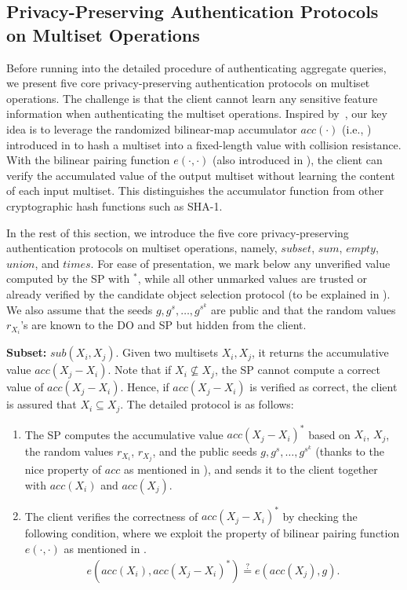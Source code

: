 \subsection{Privacy-Preserving Authentication Protocols on Multiset Operations}\label{sec:aggregate-queries:multiset-op}

Before running into the detailed procedure of authenticating aggregate queries, we present five core privacy-preserving authentication protocols on multiset operations. The challenge is that the client cannot learn any sensitive feature information when authenticating the multiset operations. Inspired by~\cite{10.1145/2660267.2660373}, our key idea is to leverage the randomized bilinear-map accumulator $acc(\cdot)$ (i.e., ) introduced in  to hash a multiset into a fixed-length value with collision resistance. With the bilinear pairing function $e(\cdot,\cdot)$ (also introduced in ), the client can verify the accumulated value of the output multiset without learning the content of each input multiset. This distinguishes the accumulator function from other cryptographic hash functions such as SHA-1.

In the rest of this section, we introduce the five core privacy-preserving authentication protocols on multiset operations, namely, $subset$, $sum$, $empty$, $union$, and $times$. For ease of presentation, we mark below any unverified value computed by the SP with $^*$, while all other unmarked values are trusted or already verified by the candidate object selection protocol (to be explained in ). We also assume that the seeds $g, g^s, \dots, g^{s^k}$ are public and that the random values $r_{X_i}$'s are known to the DO and SP but hidden from the client.

\textbf{Subset:} $sub(X_i, X_j)$.
Given two multisets $X_i, X_j$, it returns the accumulative value $acc(X_j-X_i)$. Note that if $X_i \nsubseteq X_j$, the SP cannot compute a correct value of $acc(X_j - X_i)$. Hence, if $acc(X_j-X_i)$ is verified as correct, the client is assured that $X_i \subseteq X_j$. The detailed protocol is as follows:
\begin{enumerate}
  \item The SP computes the accumulative value ${acc(X_j-X_i)}^*$ based on $X_i$, $X_j$, the random values $r_{X_i}$, $r_{X_j}$, and the public seeds $g, g^s, \dots, g^{s^k}$ (thanks to the nice property of $acc$ as mentioned in ), and sends it to the client together with $acc(X_i)$ and $acc(X_j)$.
  \item The client verifies the correctness of ${acc(X_j-X_i)}^*$ by checking the following condition, where we exploit the property of bilinear pairing function $e(\cdot,\cdot)$ as mentioned in .
    \begin{align*}
      e(acc(X_i), {acc(X_j-X_i)}^*) \stackrel{?}{=} e(acc(X_j), g).
    \end{align*}
\end{enumerate}


